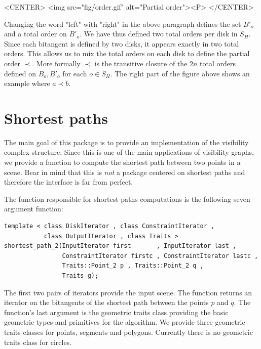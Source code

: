 \begin{ccHtmlOnly}
    <CENTER>
        <img src="fig/order.gif" alt="Partial order"><P>
    </CENTER>
\end{ccHtmlOnly}

Changing the word "left" with "right" in the above paragraph defines the set
$B'_o$ and a total order on $B'_o$. We have thus defined two total orders per
disk in $S_H$. Since each bitangent is defined by two disks, it appears exactly
in two total orders. This allows us to mix the total orders on each disk to
define the partial order $\prec$. More formally $\prec$ is the transitive
closure of the $2n$ total orders defined on $B_o, B'_o$ for each $o \in S_H$.
The right part of the figure above shows an example where $a \prec b$.

\section{Shortest paths}
The main goal of this package is to provide an implementation of the visibility
complex structure. Since this is one of the main applications of visibility
graphs, we provide a function to compute the shortest path between two points in
a scene.  Bear in mind that this is \emph{not} a package centered on shortest
paths and therefore the interface is far from perfect. 

The function responsible for shortest paths computations is the following seven
argument function:

\begin{verbatim}
template < class DiskIterator , class ConstraintIterator ,
           class OutputIterator , class Traits >
shortest_path_2(InputIterator first       , InputIterator last ,
                ConstraintIterator firstc , ConstraintIterator lastc ,
                Traits::Point_2 p , Traits::Point_2 q ,
                Traits g);
\end{verbatim}
The first two pairs of iterators provide the input scene. The function returns
an iterator on the bitangents of the shortest path between the points $p$ and
$q$.  The function's last argument is the geometric traits class providing the
basic geometric types and primitives for the algorithm. We provide three
geometric traits classes for points, segments and polygons. Currently there is
no geometric traits class for circles.


